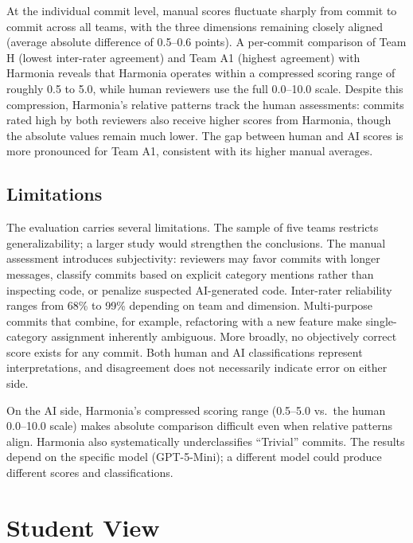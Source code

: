 \documentclass[sigconf]{acmart}
\begin{document}
At the individual commit level, manual scores fluctuate sharply from commit to commit across all teams, with the three dimensions remaining closely aligned (average absolute difference of 0.5--0.6 points). A per-commit comparison of Team H (lowest inter-rater agreement) and Team A1 (highest agreement) with Harmonia reveals that Harmonia operates within a compressed scoring range of roughly 0.5 to 5.0, while human reviewers use the full 0.0--10.0 scale. Despite this compression, Harmonia's relative patterns track the human assessments: commits rated high by both reviewers also receive higher scores from Harmonia, though the absolute values remain much lower. The gap between human and AI scores is more pronounced for Team A1, consistent with its higher manual averages.

\subsection{Limitations}
The evaluation carries several limitations. The sample of five teams restricts generalizability; a larger study would strengthen the conclusions. The manual assessment introduces subjectivity: reviewers may favor commits with longer messages, classify commits based on explicit category mentions rather than inspecting code, or penalize suspected AI-generated code. Inter-rater reliability ranges from 68\% to 99\% depending on team and dimension. Multi-purpose commits that combine, for example, refactoring with a new feature make single-category assignment inherently ambiguous. More broadly, no objectively correct score exists for any commit. Both human and AI classifications represent interpretations, and disagreement does not necessarily indicate error on either side.

On the AI side, Harmonia's compressed scoring range (0.5--5.0 vs.\ the human 0.0--10.0 scale) makes absolute comparison difficult even when relative patterns align. Harmonia also systematically underclassifies ``Trivial'' commits. The results depend on the specific model (GPT-5-Mini); a different model could produce different scores and classifications.

\section{Student View}
\label{sec:student_view}
\end{document}
